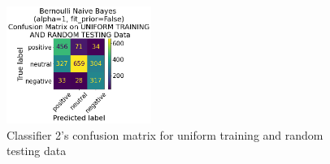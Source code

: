 \documentclass[11pt]{article}
\begin{document}
\begin{figure}[!h]
	\centering
	\includegraphics[width = 0.42\textwidth]{cf/BernoulliNaiveBayesalpha1fit_priorFalse-UniformTrainingandRandomTesting-confusion-matrix.png}
	\caption{Classifier 2's confusion matrix for uniform training and random testing data}
	\label{fig:cf-2nd-ur}
\end{figure} 
\end{document}
